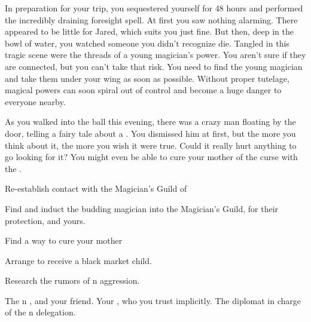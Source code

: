 \documentclass[char]{NeptuneBall}
\begin{document}
In preparation for your trip, you sequestered yourself for 48 hours and performed the incredibly draining foresight spell. At first you saw nothing alarming. There appeared to be little for Jared, which suits you just fine. But then, deep in the bowl of water, you watched someone you didn't recognize die. Tangled in this tragic scene were the threads of a young magician's power. You aren't sure if they are connected, but you can't take that risk. You need to find the young magician and take them under your wing as soon as possible. Without proper tutelage, magical powers can soon spiral out of control and become a huge danger to everyone nearby.

As you walked into the ball this evening, there was a crazy man floating by the door, telling a fairy tale about a \iWishingStone{\MYname}. You dismissed him at first, but the more you think about it, the more you wish it were true. Could it really hurt anything to go looking for it? You might even be able to cure your mother of the curse with the \iWishingStone{\MYname}.

\begin{itemz}[Goals]
  \item Re-establish contact with the Magician's Guild of \pAtlantis{}
  \item Find and induct the budding magician into the Magician's Guild, for their protection, and yours.
  \item Find a way to cure your mother
  \item Arrange to receive a black market child.
  \item Research the rumors of \pIndia{}n aggression.
\end{itemz}

\begin{contacts}
  \contact{\cPrince{}} The \pPacifica{}n \cPrince{\Prince}, and your friend.
  \contact{\cSpy{}} Your \cSpy{\sibling}, who you trust implicitly.
  \contact{\cDiplomat{}} The diplomat in charge of the \pPacifica{}n delegation.
\end{contacts}
\end{document}
